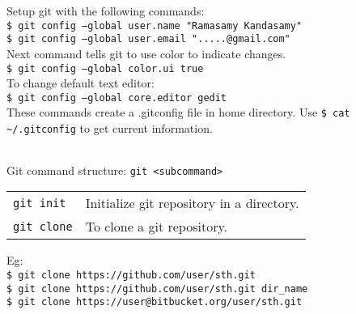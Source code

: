 Setup git with the following commands:\\
\texttt{\$ git config --global user.name "Ramasamy Kandasamy"}\\
\texttt{\$ git config --global user.email ".....@gmail.com"}\\
Next command tells git to use color to indicate changes.\\
\texttt{\$ git config --global color.ui true}\\
To change default text editor:\\
\texttt{\$ git config --global core.editor gedit}\\
These commands create a .gitconfig file in home directory. Use \texttt{\$ cat \~{}/.gitconfig} to get current information.\\
\begin{tabularx}{\linewidth}{X}
\hline
\end{tabularx}


Git command structure: \texttt{git <subcommand>}
\begin{tabularx}{\linewidth}{lX}
\texttt{git init} & Initialize git repository in a directory.\\
\texttt{git clone} & To clone a git repository.\\ 
\end{tabularx}
Eg:\\
\texttt{\$ git clone https://github.com/user/sth.git}\\
\texttt{\$ git clone https://github.com/user/sth.git dir\_name}\\
\texttt{\$ git clone https://user@bitbucket.org/user/sth.git}\\
\begin{tabularx}{\linewidth}{X}
\hline 
\end{tabularx}



